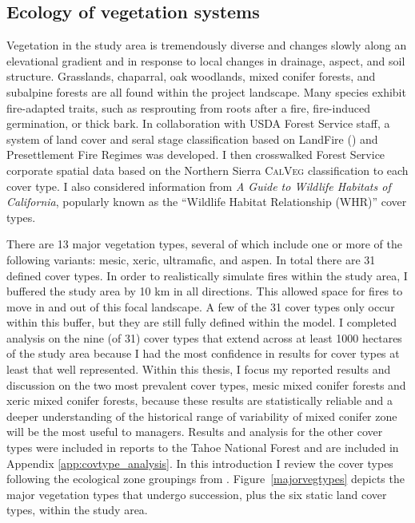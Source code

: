 \subsection{Ecology of vegetation systems}
Vegetation in the study area is tremendously diverse and changes slowly along an elevational gradient and in response to local changes in drainage, aspect, and soil structure. Grasslands, chaparral, oak woodlands, mixed conifer forests, and subalpine forests are all found within the project landscape. Many species exhibit fire-adapted traits, such as resprouting from roots after a fire, fire-induced germination, or thick bark. In collaboration with USDA Forest Service staff, a system of land cover and seral stage classification based on LandFire (\mbox{}) and \citet[]['s]{VandeWater2011} Presettlement Fire Regimes was developed. I then crosswalked Forest Service corporate spatial data based on the Northern Sierra \textsc{CalVeg} classification to each cover type. I also considered information from \emph{A Guide to Wildlife Habitats of California}, popularly known as the ``Wildlife Habitat Relationship (WHR)'' cover types. 

There are 13 major vegetation types, several of which include one or more of the following variants: mesic, xeric, ultramafic, and aspen. In total there are 31 defined cover types. In order to realistically simulate fires within the study area, I buffered the study area by 10 km in all directions. This allowed space for fires to move in and out of this focal landscape. A few of the 31 cover types only occur within this buffer, but they are still fully defined within the model. I completed analysis on the nine (of 31) cover types that extend across at least 1000 hectares of the study area because I had the most confidence in results for cover types at least that well represented. Within this thesis, I focus my reported results and discussion on the two most prevalent cover types, mesic mixed conifer forests and xeric mixed conifer forests, because these results are statistically reliable and a deeper understanding of the historical range of variability of mixed conifer zone will be the most useful to managers. Results and analysis for the other cover types were included in reports to the Tahoe National Forest and are included in Appendix \ref{app:covtype_analysis}. In this introduction I review the cover types following the ecological zone groupings from \citet{VanWag2006}. Figure~\ref{majorvegtypes} depicts the major vegetation types that undergo succession, plus the six static land cover types, within the study area. 

